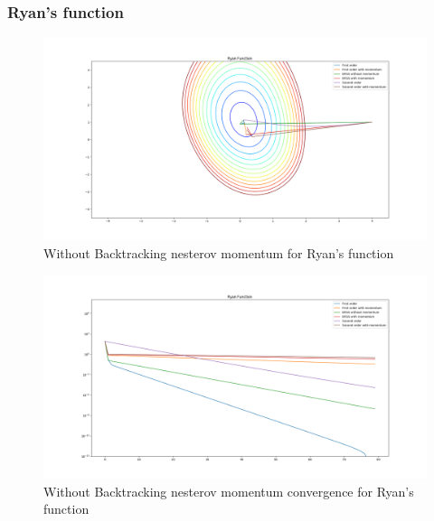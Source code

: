 \documentclass{article}
\begin{document}
\subsubsection{Ryan's function}
\begin{center}
\begin{figure}[H]
	\includegraphics[width=\linewidth]{../Images/ryannesterov.png}
	\caption{Without Backtracking nesterov momentum for Ryan's function}
	\label{fig:Without Backtracking nesterov momentum for Ryan's function}
\end{figure}

\begin{figure}[H]
	\includegraphics[width=\linewidth]{../Images/ryannesterov1.png}
	\caption{Without Backtracking nesterov momentum convergence for Ryan's function}
	\label{fig:Without Backtracking nesterov momentum convergence for Ryan's function}
\end{figure}


\end{center}
\end{document}
